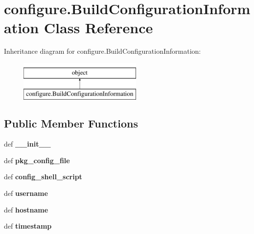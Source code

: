 \hypertarget{classconfigure_1_1BuildConfigurationInformation}{\section{configure.\-Build\-Configuration\-Information Class Reference}
\label{classconfigure_1_1BuildConfigurationInformation}
}
Inheritance diagram for configure.\-Build\-Configuration\-Information\-:\begin{figure}[H]
\begin{center}
\leavevmode
\includegraphics[height=2.000000cm]{classconfigure_1_1BuildConfigurationInformation}
\end{center}
\end{figure}
\subsection*{Public Member Functions}
\begin{DoxyCompactItemize}
\item 
\hypertarget{classconfigure_1_1BuildConfigurationInformation_ae2df87ec230e67aca4cac64fec18128c}{def {\bfseries \-\_\-\-\_\-init\-\_\-\-\_\-}}\label{classconfigure_1_1BuildConfigurationInformation_ae2df87ec230e67aca4cac64fec18128c}

\item 
\hypertarget{classconfigure_1_1BuildConfigurationInformation_a3abf2b444af38ae6b86e6e32b5b7feb2}{def {\bfseries pkg\-\_\-config\-\_\-file}}\label{classconfigure_1_1BuildConfigurationInformation_a3abf2b444af38ae6b86e6e32b5b7feb2}

\item 
\hypertarget{classconfigure_1_1BuildConfigurationInformation_a60f8eb8ec469141c0cfe94a759820ad4}{def {\bfseries config\-\_\-shell\-\_\-script}}\label{classconfigure_1_1BuildConfigurationInformation_a60f8eb8ec469141c0cfe94a759820ad4}

\item 
\hypertarget{classconfigure_1_1BuildConfigurationInformation_a6e572753d40f5446d2aac14e7fc20761}{def {\bfseries username}}\label{classconfigure_1_1BuildConfigurationInformation_a6e572753d40f5446d2aac14e7fc20761}

\item 
\hypertarget{classconfigure_1_1BuildConfigurationInformation_a1f9f4054f506079ebe07f26831892d4f}{def {\bfseries hostname}}\label{classconfigure_1_1BuildConfigurationInformation_a1f9f4054f506079ebe07f26831892d4f}

\item 
\hypertarget{classconfigure_1_1BuildConfigurationInformation_a512419391e7985f2d718fadba3df180e}{def {\bfseries timestamp}}\label{classconfigure_1_1BuildConfigurationInformation_a512419391e7985f2d718fadba3df180e}

\end{DoxyCompactItemize}
